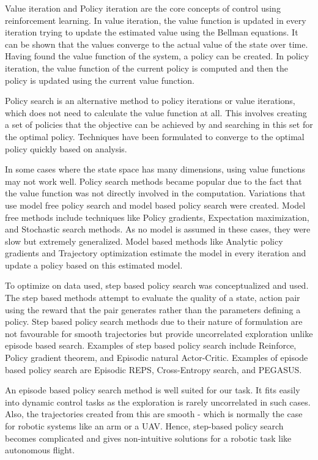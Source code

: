 \documentclass[hidelinks,BTech]{iitmdiss}
\begin{document}
Value iteration and Policy iteration are the core concepts of control using reinforcement learning. In value iteration, the value function is updated in every iteration trying to update the estimated value using the Bellman equations. It can be shown that the values converge to the actual value of the state over time. Having found the value function of the system, a policy can be created. In policy iteration, the value function of the current policy is computed and then the policy is updated using the current value function.

Policy search is an alternative method to policy iterations or value iterations, which does not need to calculate the value function at all. This involves creating a set of policies that the objective can be achieved by and searching in this set for the optimal policy. Techniques have been formulated to converge to the optimal policy quickly based on analysis.

In some cases where the state space has many dimensions, using value functions may not work well. Policy search methods became popular due to the fact that the value function was not directly involved in the computation. Variations that use model free policy search and model based policy search were created. Model free methods include techniques like Policy gradients, Expectation maximization, and Stochastic search methods. As no model is assumed in these cases, they were slow but extremely generalized. Model based methods like Analytic policy gradients and Trajectory optimization estimate the model in every iteration and update a policy based on this estimated model.

To optimize on data used, step based policy search was conceptualized and used. The step based methods attempt to evaluate the quality of a state, action pair using the reward that the pair generates rather than the parameters defining a policy. Step based policy search methods due to their nature of formulation are not favourable for smooth trajectories but provide uncorrelated exploration unlike episode based search. Examples of step based policy search include Reinforce, Policy gradient theorem, and Episodic natural Actor-Critic. Examples of episode based policy search are Episodic REPS, Cross-Entropy search, and PEGASUS.

An episode based policy search method is well suited for our task. It fits easily into dynamic control tasks as the exploration is rarely uncorrelated in such cases. Also, the trajectories created from this are smooth - which is normally the case for robotic systems like an arm or a UAV. Hence, step-based policy search becomes complicated and gives non-intuitive solutions for a robotic task like autonomous flight.
\end{document}

